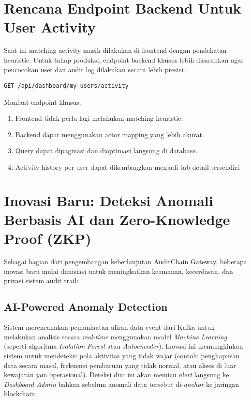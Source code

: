 

\section{Rencana Endpoint Backend Untuk User Activity}

Saat ini matching activity masih dilakukan di frontend dengan pendekatan heuristic. Untuk tahap produksi, endpoint backend khusus lebih disarankan agar pencocokan user dan audit log dilakukan secara lebih presisi.

\begin{lstlisting}
GET /api/dashboard/my-users/activity
\end{lstlisting}

Manfaat endpoint khusus:

\begin{enumerate}
    \item Frontend tidak perlu lagi melakukan matching heuristic.
    \item Backend dapat menggunakan actor mapping yang lebih akurat.
    \item Query dapat dipaginasi dan dioptimasi langsung di database.
    \item Activity history per user dapat dikembangkan menjadi tab detail tersendiri.
\end{enumerate}

\section{Inovasi Baru: Deteksi Anomali Berbasis AI dan Zero-Knowledge Proof (ZKP)}

Sebagai bagian dari pengembangan keberlanjutan AuditChain Gateway, beberapa inovasi baru mulai diinisiasi untuk meningkatkan keamanan, kecerdasan, dan privasi sistem audit trail:

\subsection{AI-Powered Anomaly Detection}
Sistem merencanakan pemanfaatan aliran data event dari Kafka untuk melakukan analisis secara \textit{real-time} menggunakan model \textit{Machine Learning} (seperti algoritma \textit{Isolation Forest} atau \textit{Autoencoder}). Inovasi ini memungkinkan sistem untuk mendeteksi pola aktivitas yang tidak wajar (contoh: penghapusan data secara masal, frekuensi pembaruan yang tidak normal, atau akses di luar kewajaran jam operasional). Deteksi dini ini akan memicu \textit{alert} langsung ke \textit{Dashboard Admin} bahkan sebelum anomali data tersebut di-\textit{anchor} ke jaringan blockchain.

